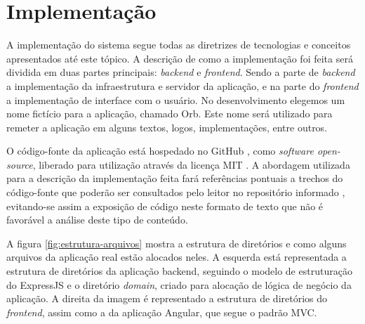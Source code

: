 \chapter{Implementação}
A implementação do sistema segue todas as diretrizes de tecnologias e conceitos apresentados até este tópico. A descrição de como a implementação foi feita será dividida em duas partes principais: \textit{backend} e \textit{frontend}. Sendo a parte de \textit{backend} a implementação da infraestrutura e servidor da aplicação, e na parte do \textit{frontend} a implementação de interface com o usuário. No desenvolvimento elegemos um nome fictício para a aplicação, chamado Orb. Este nome será utilizado para remeter a aplicação em alguns textos, logos, implementações, entre outros.

O código-fonte da aplicação está hospedado no GitHub \cite{orb}, como \textit{software open-source}, liberado para utilização através da licença MIT \cite{mit}. A abordagem utilizada para a descrição da implementação feita fará referências pontuais a trechos do código-fonte que poderão ser consultados pelo leitor no repositório informado \cite{orb}, evitando-se assim a exposição de código neste formato de texto que não é favorável a análise deste tipo de conteúdo.

A figura \ref{fig:estrutura-arquivos} mostra a estrutura de diretórios e como alguns arquivos da aplicação real estão alocados neles. A esquerda está representada a estrutura de diretórios da aplicação backend, seguindo o modelo de estruturação do ExpressJS e o diretório \textit{domain}, criado para alocação de lógica de negócio da aplicação. A direita da imagem é representado a estrutura de diretórios do \textit{frontend}, assim como a da aplicação Angular, que segue o padrão MVC.

